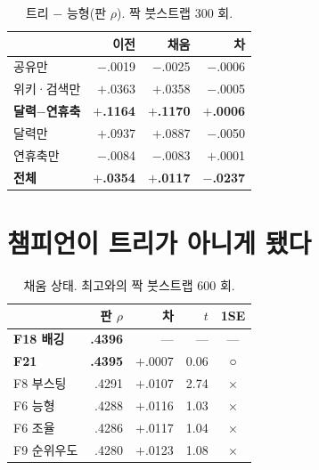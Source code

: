 \documentclass[10pt]{article}
\begin{document}
\begin{table}[t]
\centering\tsize
\caption{트리 $-$ 능형(판 $\rho$). 짝 붓스트랩 300 회.}
\begin{tabular}{lrrr}
\toprule
& 이전 & 채움 & 차 \\
\midrule
공유만 & $-$.0019 & $-$.0025 & $-$.0006 \\
위키·검색만 & $+$.0363 & $+$.0358 & $-$.0005 \\
\textbf{달력$-$연휴축} & \textbf{$+$.1164} & \textbf{$+$.1170} & \textbf{$+$.0006} \\
달력만 & $+$.0937 & $+$.0887 & $-$.0050 \\
연휴축만 & $-$.0084 & $-$.0083 & $+$.0001 \\
\midrule
\textbf{전체} & \textbf{$+$.0354} & \textbf{$+$.0117} & \textbf{$-$.0237} \\
\bottomrule
\end{tabular}
\end{table}



\section{챔피언이 트리가 아니게 됐다}

\begin{table}[t]
\centering\tsize
\caption{채움 상태. 최고와의 짝 붓스트랩 600 회.}
\begin{tabular}{lrrrc}
\toprule
& 판 $\rho$ & 차 & $t$ & 1SE \\
\midrule
\textbf{F18 배깅} & \textbf{.4396} & --- & --- & --- \\
\textbf{F21} & \textbf{.4395} & $+$.0007 & 0.06 & \textbf{○} \\
F8 부스팅 & .4291 & $+$.0107 & 2.74 & × \\
F6 능형 & .4288 & $+$.0116 & 1.03 & × \\
F6 조율 & .4286 & $+$.0117 & 1.04 & × \\
F9 순위우도 & .4280 & $+$.0123 & 1.08 & × \\
\bottomrule
\end{tabular}
\end{table}
\end{document}
